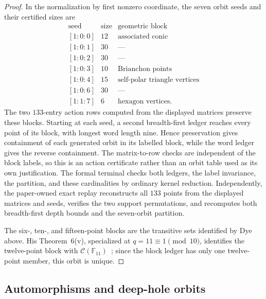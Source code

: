 \documentclass[11pt]{article}
\theoremstyle{definition}
\theoremstyle{remark}
\newcommand{\F}{\mathbb{F}}
\newcommand{\cC}{\mathcal{C}}
\begin{document}
\begin{proof}
In the normalization by first nonzero coordinate, the seven orbit seeds and
their certified sizes are
\[
\begin{array}{c|c|l}
\text{seed}&\text{size}&\text{geometric block}\\
\hline
{[1{:}0{:}0]}&12&\text{associated conic}\\
{[1{:}0{:}1]}&30&\text{---}\\
{[1{:}0{:}2]}&30&\text{---}\\
{[1{:}0{:}3]}&10&\text{Brianchon points}\\
{[1{:}0{:}4]}&15&\text{self-polar triangle vertices}\\
{[1{:}0{:}6]}&30&\text{---}\\
{[1{:}1{:}7]}&6&\text{hexagon vertices}.
\end{array}
\]
The two $133$-entry action rows computed from the displayed matrices preserve
these blocks. Starting at each seed, a second breadth-first ledger reaches
every point of its block, with longest word length nine. Hence preservation
gives containment of each generated orbit in its labelled block, while the
word ledger gives the reverse containment. The matrix-to-row checks are
independent of the block labels, so this is an action certificate rather than
an orbit table used as its own justification. The formal terminal
 checks both ledgers, the label
invariance, the partition, and these cardinalities by ordinary kernel
reduction. Independently, the paper-owned exact replay
 reconstructs all $133$ points from the
displayed matrices and seeds, verifies the two support permutations, and
recomputes both breadth-first depth bounds and the seven-orbit partition.

The six-, ten-, and fifteen-point blocks are the transitive sets identified
by Dye above.  His Theorem~6(v), specialized at
$q=11\equiv1\pmod{10}$, identifies the twelve-point block with
$\cC(\F_{11})$~\cite[pp.~281--282; \S3.1, p.~284]{Dye1991}; since the block
ledger has only one twelve-point member, this orbit is unique.
\end{proof}

\subsection{Automorphisms and deep-hole orbits}
\label{sec:automorphisms}
\end{document}
